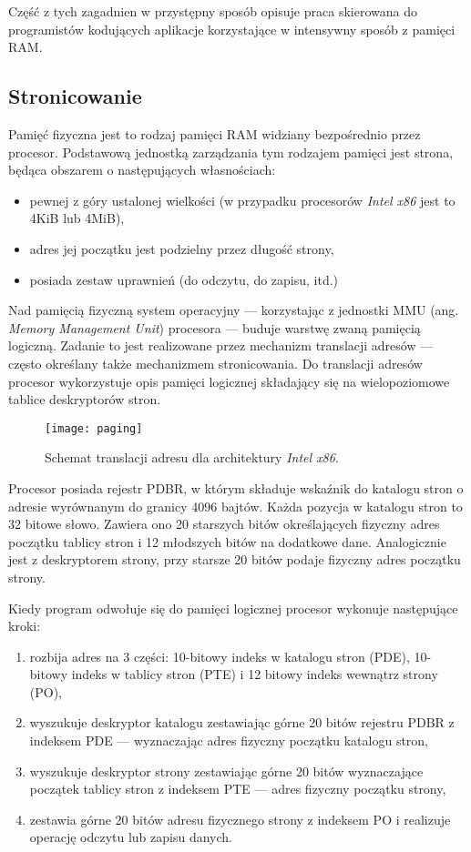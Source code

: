 \documentclass[12pt,a4paper,titlepage,twoside]{mwart}
\begin{document}
Część z tych zagadnien w przystępny sposób opisuje praca \cite{pas02memory}
skierowana do programistów kodujących aplikacje korzystające w intensywny
sposób z pamięci RAM.

\subsection{Stronicowanie}

Pamięć fizyczna jest to rodzaj pamięci RAM widziany bezpośrednio przez
procesor. Podstawową jednostką zarządzania tym rodzajem pamięci jest strona,
będąca obszarem o następujących własnościach:

\begin{itemize}
\item pewnej z góry ustalonej wielkości (w przypadku procesorów \textit{Intel
x86} jest to 4KiB lub 4MiB),
\item adres jej początku jest podzielny przez długość strony,
\item posiada zestaw uprawnień (do odczytu, do zapisu, itd.)
\end{itemize}

Nad pamięcią fizyczną system operacyjny --- korzystając z jednostki MMU (ang.
\textit{Memory Management Unit}) procesora --- buduje warstwę zwaną pamięcią
logiczną. Zadanie to jest realizowane przez mechanizm translacji adresów ---
często określany także mechanizmem stronicowania. Do translacji adresów
procesor wykorzystuje opis pamięci logicznej składający się na wielopoziomowe
tablice deskryptorów stron.

\begin{figure}[h]
\centering
\texttt{[image: paging]}
\caption{Schemat translacji adresu dla architektury \textit{Intel x86}.}
\end{figure}

Procesor posiada rejestr PDBR, w którym składuje wskaźnik do katalogu stron o
adresie wyrównanym do granicy 4096 bajtów. Każda pozycja w katalogu stron to 32
bitowe słowo. Zawiera ono 20 starszych bitów określających fizyczny adres
początku tablicy stron i 12 młodszych bitów na dodatkowe dane.  Analogicznie
jest z deskryptorem strony, przy starsze 20 bitów podaje fizyczny adres
początku strony.

Kiedy program odwołuje się do pamięci logicznej procesor wykonuje następujące kroki:
\begin{enumerate}
\item rozbija adres na 3 części: 10-bitowy indeks w katalogu stron (PDE), 10-bitowy
indeks w tablicy stron (PTE) i 12 bitowy indeks wewnątrz strony (PO),
\item wyszukuje deskryptor katalogu zestawiając górne 20 bitów rejestru PDBR z
indeksem PDE --- wyznaczając adres fizyczny początku katalogu stron,
\item wyszukuje deskryptor strony zestawiając górne 20 bitów wyznaczające
początek tablicy stron z indeksem PTE --- adres fizyczny początku strony,
\item zestawia górne 20 bitów adresu fizycznego strony z indeksem PO i
realizuje operację odczytu lub zapisu danych.
\end{enumerate}
\end{document}
